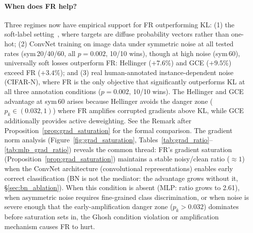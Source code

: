 \documentclass[11pt]{article}
\begin{document}
\paragraph{When does FR help?}
Three regimes now have empirical support for FR outperforming KL:
(1) the soft-label setting~\citep{bottoni2026fisherrao}, where targets are
diffuse probability vectors rather than one-hot;
(2) ConvNet training on image data under symmetric noise at all tested rates
(sym\,20/40/60, all $p=0.002$, 10/10 wins), though at high noise (sym\,60),
universally soft losses outperform FR: Hellinger ($+7.6\%$) and GCE ($+9.5\%$)
exceed FR ($+3.4\%$); and
(3) real human-annotated instance-dependent noise (CIFAR-N), where FR is
the only objective that significantly outperforms KL at all three annotation
conditions ($p=0.002$, 10/10 wins).
The Hellinger and GCE advantage at sym\,60 arises because Hellinger avoids the
danger zone ($p_k\in(0.032,1)$) where FR amplifies corrupted gradients above KL,
while GCE additionally provides active deweighting.
See the Remark after Proposition~\ref{prop:grad_saturation} for the formal comparison.
The gradient norm analysis (Figure~\ref{fig:grad_saturation},
Tables~\ref{tab:grad_ratio}--\ref{tab:mlp_grad_ratio})
reveals the common thread: FR's gradient saturation (Proposition~\ref{prop:grad_saturation})
maintains a stable noisy/clean ratio ($\approx 1$) when the ConvNet architecture
(convolutional representations) enables early correct classification
(BN is not the mediator: the advantage grows without it, \S\ref{sec:bn_ablation}).
When this condition is absent (MLP: ratio grows to 2.61), when asymmetric noise
requires fine-grained class discrimination, or when noise is severe enough that
the early-amplification danger zone ($p_k>0.032$) dominates before saturation
sets in, the Ghosh condition violation or amplification mechanism causes FR to hurt.
\end{document}
